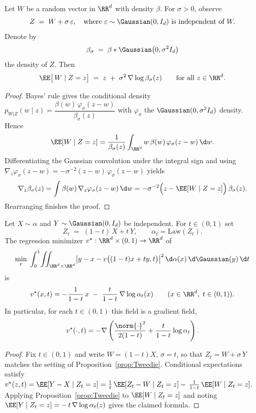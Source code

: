 \begin{proposition}\label{prop:Tweedie}
Let $W$ be a random vector in $\RR^{d}$ with density $\beta$.
For $\sigma>0$, observe
\[
Z \;=\; W + \sigma\,\varepsilon,
\quad\text{where } \varepsilon \sim \Gaussian(0,I_{d})
\text{ is independent of } W .
\]
Denote by
\[
	\beta_\sigma \;=\; \beta * \Gaussian\bigl(0,\sigma^{2}I_{d}\bigr)
\]
the density of $Z$.
Then
\[
\EE\bigl[\,W \mid Z=z\bigr]
      \;=\; z \;+\;\sigma^{2}\,\nabla \log \beta_\sigma(z)
\qquad\text{for all } z \in \RR^{d}.
\]
\end{proposition}

\begin{proof}
Bayes' rule gives the conditional density
$
p_{W|Z}(w\mid z)
= \dfrac{\beta(w)\,\varphi_\sigma(z-w)}{\beta_\sigma(z)}
$
with $\varphi_\sigma$ the $\Gaussian(0,\sigma^{2}I_{d})$ density.
Hence
\[
\EE[W\mid Z=z]
= \frac{1}{\beta_\sigma(z)}
      \int_{\RR^{d}} w\,
             \beta(w)\,\varphi_\sigma(z-w)\,\d w .
\]
Differentiating the Gaussian convolution under the integral sign and using
$
\nabla_z\varphi_\sigma(z-w)
     = -\sigma^{-2}(z-w)\,\varphi_\sigma(z-w)
$
yields
\[
\nabla_z\beta_\sigma(z)
= \int \beta(w)\,\nabla_z\varphi_\sigma(z-w)\,\d w
= -\sigma^{-2}\Bigl(z-\EE[W\mid Z=z]\Bigr)\,\beta_\sigma(z).
\]
Rearranging finishes the proof.
\end{proof}


\begin{proposition}\label{prop:flow}
Let $X\sim\alpha$ and $Y\sim\Gaussian(0,I_{d})$ be independent.
For $t\in(0,1)$ set
\[
Z_t \;=\; (1-t)\,X + t\,Y,
\qquad
\alpha_t =\text{Law}(Z_t).
\]
The regression minimizer $v^\star:\RR^d\times(0,1)\to\RR^d$ of
\[
\min_{v}\;\int_{0}^{1}\!
         \iint_{\RR^{d}\times\RR^{d}}
              \bigl|y-x-v\bigl((1-t)x+t y,t\bigr)\bigr|^{2}\,
              \d\alpha(x)\,\d\Gaussian(y)\,\d t
\]
is
\[
v^\star(x,t)
= -\frac{1}{1-t}\,x \;-\; \frac{t}{1-t}\,\nabla\log\alpha_t(x)
\qquad (x\in\RR^{d},\;t\in(0,1)).
\]
In particular, for each $t\in(0,1)$ this field is a gradient field,
\[
	v^\star(\cdot,t)=-\nabla
	\left(
		\frac{\norm{\cdot}^2}{2(1-t)}
		+\frac{t}{1-t}\log\alpha_t
	\right).
\]
\end{proposition}

\begin{proof}
Fix $t\in(0,1)$ and write $W=(1-t)X$, $\sigma=t$, so that
$Z_t = W + \sigma\,Y$ matches the setting of Proposition~\ref{prop:Tweedie}.
Conditional expectations satisfy
$
v^\star(z,t)
= \EE[Y-X\mid Z_t=z]
= \frac{1}{t}\,\EE[Z_t-W\mid Z_t=z]
  -\,\frac{1}{1-t}\,\EE[W\mid Z_t=z].
$
Applying Proposition~\ref{prop:Tweedie} to $\EE[W\mid Z_t=z]$ and
noting $\EE[Y\mid Z_t=z]
      = -\,t\,\nabla\log\alpha_t(z)$
gives the claimed formula.
\end{proof}

